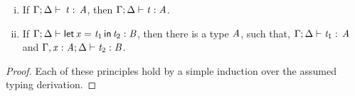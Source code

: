 \begin{lemma}[Inversion]
\begin{enumerate}[i.]
  \item If $\Gamma  ;  \Delta  \vdash  \relax \, \mathit{t}  :  \relax \, \mathit{A}$, then $\Gamma  ;  \Delta  \vdash  \mathit{t}  :  \mathit{A}$.
  \item If $\Gamma  ;  \Delta  \vdash   \mathsf{let}\,\relax  \mathit{x}  =  \mathit{t_{{\mathrm{1}}}} \,\mathsf{in}\, \mathit{t_{{\mathrm{2}}}}   :  \mathit{B}$, then there is a type $\mathit{A}$, such that,
    $\Gamma  ;  \Delta  \vdash  \mathit{t_{{\mathrm{1}}}}  :  \relax \, \mathit{A}$ and $\Gamma  ,  \mathit{x}  :  \mathit{A}  ;  \Delta  \vdash  \mathit{t_{{\mathrm{2}}}}  :  \mathit{B}$.
  \end{enumerate}
\end{lemma}
\begin{proof}
  Each of these principles hold by a simple induction over the assumed
  typing derivation.
\end{proof}


